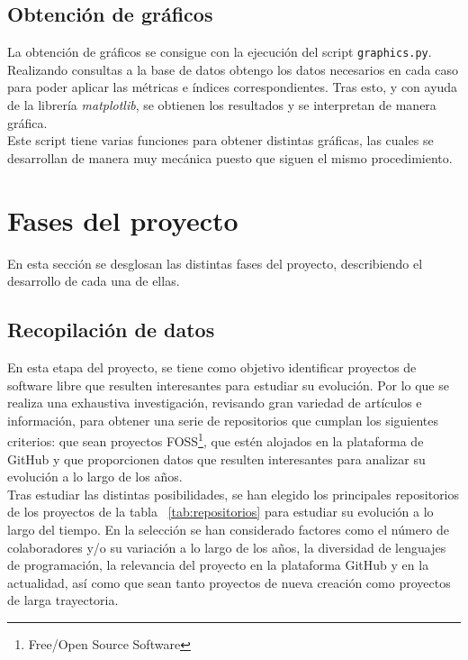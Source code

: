 \documentclass[a4paper, 12pt]{book}
\begin{document}
\subsection{Obtención de gráficos}
\label{subsec:programa-graficos}

La obtención de gráficos se consigue con la ejecución del script \texttt{graphics.py}. Realizando consultas a la base de datos obtengo los datos necesarios en cada caso para poder aplicar las métricas e índices correspondientes. Tras esto, y con ayuda
de la librería \textit{matplotlib}, se obtienen los resultados y se interpretan de manera gráfica.
\\Este script tiene varias funciones para obtener distintas gráficas, las cuales se desarrollan de manera muy mecánica puesto que siguen el mismo procedimiento.

\section{Fases del proyecto} 
\label{sec:fases-proyecto}

En esta sección se desglosan las distintas fases del proyecto, describiendo el desarrollo de cada una de ellas.

\subsection{Recopilación de datos}
\label{subsec:recopilacion}

En esta etapa del proyecto, se tiene como objetivo identificar proyectos de software libre que resulten interesantes para estudiar su evolución. Por lo que se realiza una exhaustiva investigación, revisando gran variedad de artículos e
información, para obtener una serie de repositorios que cumplan los siguientes criterios: que sean proyectos FOSS\footnote{Free/Open Source Software}, que estén alojados en la plataforma de GitHub y que proporcionen datos que resulten interesantes
para analizar su evolución a lo largo de los años.
\\Tras estudiar las distintas posibilidades, se han elegido los principales repositorios de los proyectos de la tabla ~\ref{tab:repositorios} para estudiar su evolución a lo largo del tiempo. En la selección se han considerado factores como el número de colaboradores y/o
su variación a lo largo de los años, la diversidad de lenguajes de programación, la relevancia del proyecto en la plataforma GitHub y en la actualidad, así como que sean tanto proyectos de nueva creación como proyectos de larga trayectoria.
\end{document}
